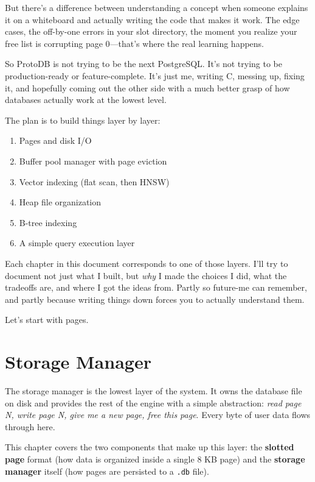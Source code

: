 \documentclass[12pt, a4paper]{report}
\begin{document}
But there's a difference between understanding a concept when someone explains
it on a whiteboard and actually writing the code that makes it work. The edge
cases, the off-by-one errors in your slot directory, the moment you realize
your free list is corrupting page 0---that's where the real learning happens.

So ProtoDB is not trying to be the next PostgreSQL. It's not trying to be
production-ready or feature-complete. It's just me, writing C, messing up,
fixing it, and hopefully coming out the other side with a much better grasp
of how databases actually work at the lowest level.

The plan is to build things layer by layer:
\begin{enumerate}[itemsep=2pt]
    \item Pages and disk I/O
    \item Buffer pool manager with page eviction
    \item Vector indexing (flat scan, then HNSW)
    \item Heap file organization
    \item B-tree indexing
    \item A simple query execution layer
\end{enumerate}

Each chapter in this document corresponds to one of those layers. I'll try to
document not just what I built, but \textit{why} I made the choices I did,
what the tradeoffs are, and where I got the ideas from. Partly so future-me
can remember, and partly because writing things down forces you to actually
understand them.

Let's start with pages.


\chapter{Storage Manager}

The storage manager is the lowest layer of the system. It owns the database
file on disk and provides the rest of the engine with a simple abstraction:
\textit{read page N, write page N, give me a new page, free this page}. Every
byte of user data flows through here.

This chapter covers the two components that make up this layer: the
\textbf{slotted page} format (how data is organized inside a single 8 KB
page) and the \textbf{storage manager} itself (how pages are persisted to a
\texttt{.db} file).
\end{document}
